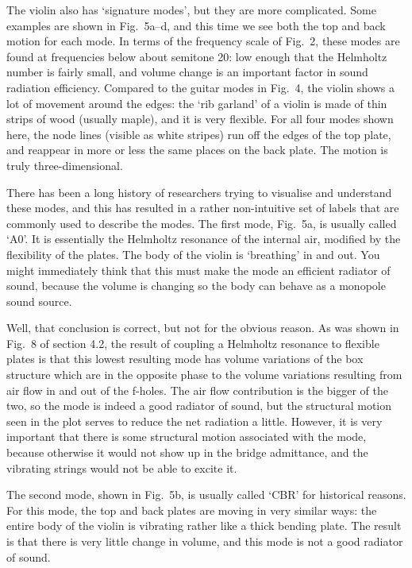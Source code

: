  The violin also has `signature modes', but they are more complicated. Some 
  examples are shown in Fig.\ 5a--d, and this time we see both the top and back 
  motion for each mode. In terms of the frequency scale of Fig.\ 2, these modes 
  are found at frequencies below about semitone 20: low enough that the 
  Helmholtz number is fairly small, and volume change is an important factor in 
  sound radiation efficiency. Compared to the guitar modes in Fig.\ 4, the 
  violin shows a lot of movement around the edges: the `rib garland' of a 
  violin is made of thin strips of wood (usually maple), and it is very 
  flexible. For all four modes shown here, the node lines (visible as white 
  stripes) run off the edges of the top plate, and reappear in more or less the 
  same places on the back plate. The motion is truly three-dimensional. 

  There has been a long history of researchers trying to visualise and 
  understand these modes, and this has resulted in a rather non-intuitive set 
  of labels that are commonly used to describe the modes. The first mode, Fig.\ 
  5a, is usually called `A0'. It is essentially the Helmholtz resonance of the 
  internal air, modified by the flexibility of the plates. The body of the 
  violin is `breathing' in and out. You might immediately think that this must 
  make the mode an efficient radiator of sound, because the volume is changing 
  so the body can behave as a monopole sound source. 

  Well, that conclusion is correct, but not for the obvious reason. As was 
  shown in Fig.\ 8 of section 4.2, the result of coupling a Helmholtz resonance 
  to flexible plates is that this lowest resulting mode has volume variations 
  of the box structure which are in the opposite phase to the volume variations 
  resulting from air flow in and out of the f-holes. The air flow contribution 
  is the bigger of the two, so the mode is indeed a good radiator of sound, but 
  the structural motion seen in the plot serves to reduce the net radiation a 
  little. However, it is very important that there is some structural motion 
  associated with the mode, because otherwise it would not show up in the 
  bridge admittance, and the vibrating strings would not be able to excite it. 

  The second mode, shown in Fig.\ 5b, is usually called `CBR' for historical 
  reasons. For this mode, the top and back plates are moving in very similar 
  ways: the entire body of the violin is vibrating rather like a thick bending 
  plate. The result is that there is very little change in volume, and this 
  mode is not a good radiator of sound. 

